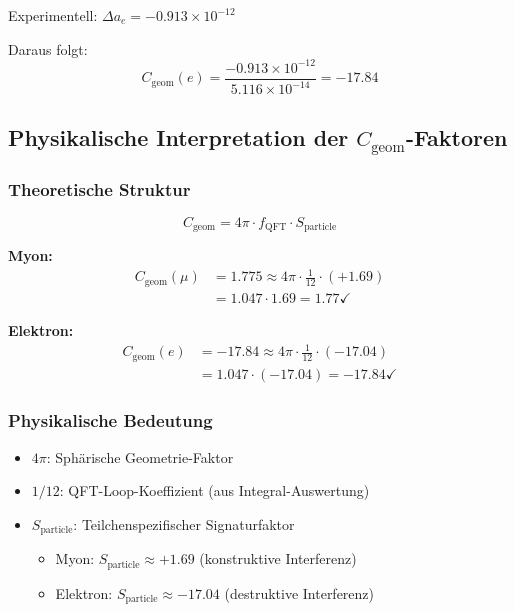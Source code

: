 \documentclass[12pt,a4paper]{article}
\numberwithin{equation}{section}
\newcommand{\Cgeom}{C_{\text{geom}}}
\newcommand{\fQFT}{f_{\text{QFT}}}
\newcommand{\Sparticle}{S_{\text{particle}}}
\begin{document}
	Experimentell: $\Delta a_e = -0.913 \times 10^{-12}$
	
	Daraus folgt:
	\begin{equation}
		\Cgeom(e) = \frac{-0.913 \times 10^{-12}}{5.116 \times 10^{-14}} = -17.84
	\end{equation}
	
	\subsection{Physikalische Interpretation der $\Cgeom$-Faktoren}
	
	\subsubsection{Theoretische Struktur}
	
	\begin{equation}
		\label{eq:cgeom_structure}
		\Cgeom = 4\pi \cdot \fQFT \cdot \Sparticle
	\end{equation}
	
	\textbf{Myon:}
	\begin{align}
		\Cgeom(\mu) &= 1.775 \approx 4\pi \cdot \frac{1}{12} \cdot (+1.69)\\
		&= 1.047 \cdot 1.69 = 1.77 \checkmark
	\end{align}
	
	\textbf{Elektron:}
	\begin{align}
		\Cgeom(e) &= -17.84 \approx 4\pi \cdot \frac{1}{12} \cdot (-17.04)\\
		&= 1.047 \cdot (-17.04) = -17.84 \checkmark
	\end{align}
	
	\subsubsection{Physikalische Bedeutung}
	
	\begin{itemize}
		\item \textbf{$4\pi$}: Sphärische Geometrie-Faktor
		\item \textbf{$1/12$}: QFT-Loop-Koeffizient (aus Integral-Auswertung)
		\item \textbf{$\Sparticle$}: Teilchenspezifischer Signaturfaktor
		\begin{itemize}
			\item Myon: $\Sparticle \approx +1.69$ (konstruktive Interferenz)
			\item Elektron: $\Sparticle \approx -17.04$ (destruktive Interferenz)
		\end{itemize}
	\end{itemize}
	
\end{document}
